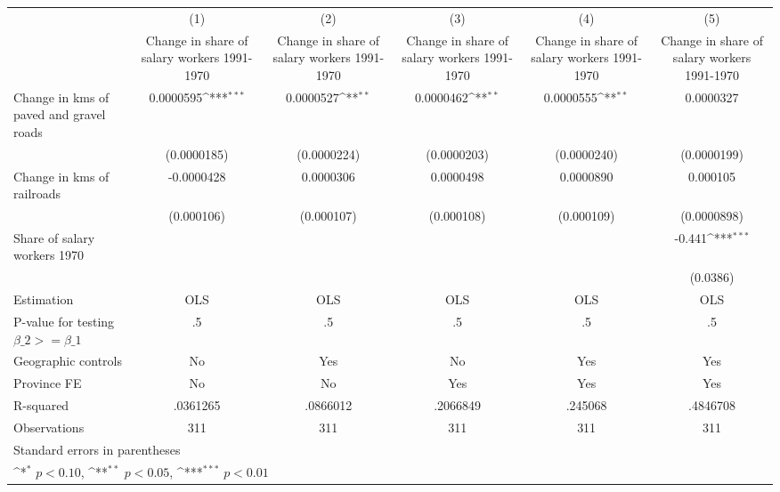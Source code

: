 {
\def\sym#1{\ifmmode^{#1}\else\(^{#1}\)\fi}
\begin{tabular}{l*{5}{c}}
\hline\hline
                    &\multicolumn{1}{c}{(1)}&\multicolumn{1}{c}{(2)}&\multicolumn{1}{c}{(3)}&\multicolumn{1}{c}{(4)}&\multicolumn{1}{c}{(5)}\\
                    &\multicolumn{1}{c}{Change in share of salary workers 1991-1970}&\multicolumn{1}{c}{Change in share of salary workers 1991-1970}&\multicolumn{1}{c}{Change in share of salary workers 1991-1970}&\multicolumn{1}{c}{Change in share of salary workers 1991-1970}&\multicolumn{1}{c}{Change in share of salary workers 1991-1970}\\
\hline
Change in kms of paved and gravel roads&   0.0000595\sym{***}&   0.0000527\sym{**} &   0.0000462\sym{**} &   0.0000555\sym{**} &   0.0000327         \\
                    & (0.0000185)         & (0.0000224)         & (0.0000203)         & (0.0000240)         & (0.0000199)         \\
[1em]
Change in kms of railroads&  -0.0000428         &   0.0000306         &   0.0000498         &   0.0000890         &    0.000105         \\
                    &  (0.000106)         &  (0.000107)         &  (0.000108)         &  (0.000109)         & (0.0000898)         \\
[1em]
Share of salary workers 1970&                     &                     &                     &                     &      -0.441\sym{***}\\
                    &                     &                     &                     &                     &    (0.0386)         \\
\hline
Estimation          &         OLS         &         OLS         &         OLS         &         OLS         &         OLS         \\
P-value for testing $\beta\_2 >= \beta\_1$&          .5         &          .5         &          .5         &          .5         &          .5         \\
Geographic controls &          No         &         Yes         &          No         &         Yes         &         Yes         \\
Province FE         &          No         &          No         &         Yes         &         Yes         &         Yes         \\
R-squared           &    .0361265         &    .0866012         &    .2066849         &     .245068         &    .4846708         \\
Observations        &         311         &         311         &         311         &         311         &         311         \\
\hline\hline
\multicolumn{6}{l}{\footnotesize Standard errors in parentheses}\\
\multicolumn{6}{l}{\footnotesize \sym{*} \(p<0.10\), \sym{**} \(p<0.05\), \sym{***} \(p<0.01\)}\\
\end{tabular}
}
